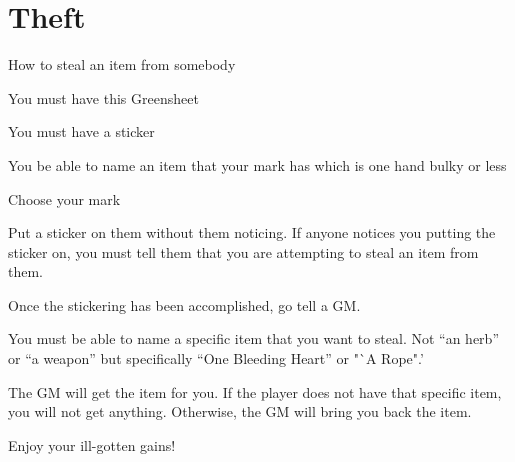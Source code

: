 \documentclass[green]{guildcamp2}
\begin{document}
\name{\gTheft{}}

\section{Theft}
How to steal an item from somebody

\begin{enum}[Requirements]
	\item You must have this Greensheet
	\item You must have a sticker
	\item You be able to name an item that your mark has which is one hand bulky or less
\end{enum}

\begin{enum}[Directions]
	\item Choose your mark
	\item Put a sticker on them without them noticing. If anyone notices you putting the sticker on, you must tell them that you are attempting to steal an item from them.
	\item Once the stickering has been accomplished, go tell a GM.
	\item You must be able to name a specific item that you want to steal. Not "`an herb"' or "`a weapon"' but specifically "`One Bleeding Heart"' or "`A Rope".'
	\item The GM will get the item for you. If the player does not have that specific item, you will not get anything. Otherwise, the GM will bring you back the item.
	\item Enjoy your ill-gotten gains!	
\end{enum}
	
\end{document}
